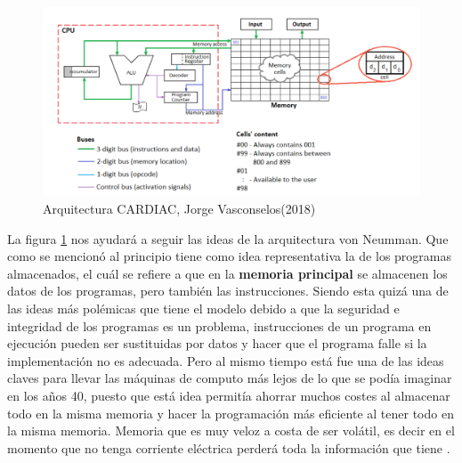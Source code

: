 \documentclass[letterpaper,12pt,oneside]{book}
\begin{document}
		\begin{figure}[h]
			\includegraphics[scale=0.3]{media/Arquitectura_CARDIAC.png}
			\caption{Arquitectura CARDIAC, Jorge Vasconselos(2018) }%
			\label{fig:Arq_CARDIAC}
		\end{figure}
		
		La figura \ref{fig:Arq_CARDIAC} nos ayudará a seguir las ideas de la arquitectura von Neumman. Que como se mencionó al principio tiene
		como idea representativa la de los programas almacenados, el cuál se refiere a que en la \textbf{memoria principal} se almacenen los datos de
		los programas, pero también las instrucciones. Siendo esta quizá una de las ideas más polémicas que tiene el modelo debido a que la
		seguridad e integridad de los programas es un problema, instrucciones de un programa en ejecución pueden ser sustituidas por datos
		y hacer que el programa falle si la implementación no es adecuada. Pero al mismo tiempo está fue una de las ideas claves para llevar las
		máquinas de computo más lejos de lo que se podía imaginar en los años 40, puesto que está idea permitía ahorrar muchos costes al almacenar todo
		en la misma memoria y hacer la programación más eficiente al tener todo en la misma 
		memoria. Memoria que es muy veloz a costa de ser volátil, es decir en el momento que no tenga corriente eléctrica perderá
		toda la información que tiene \cite{tanenbaum_structured_2013}.
		
\end{document}
